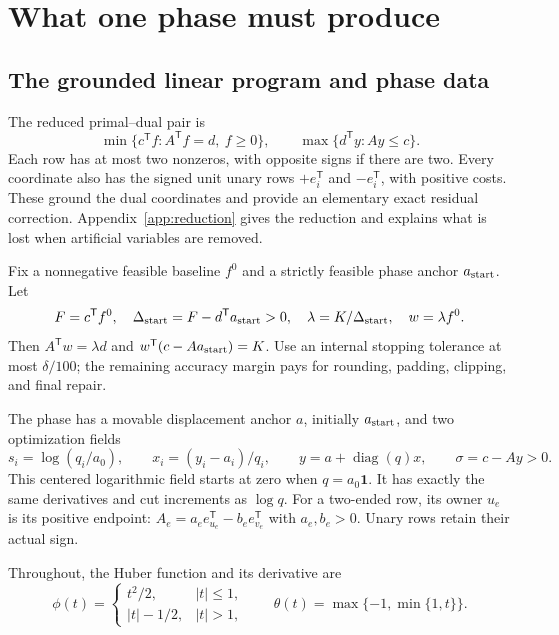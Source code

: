 \documentclass[11pt]{article}
\theoremstyle{definition}\newtheorem{definition}[theorem]{Definition}
\theoremstyle{remark}\newtheorem{remark}[theorem]{Remark}
\newcommand{\one}{\mathbf1}
\newcommand{\diag}{\operatorname{diag}}
\begin{document}
\section{What one phase must produce}\label{sec:phase-target}

\subsection{The grounded linear program and phase data}

The reduced primal--dual pair is
\begin{equation}\label{eq:LP}
 \min\{c^{\mathsf T}f:A^{\mathsf T}f=d,\ f\ge0\},
 \qquad \max\{d^{\mathsf T}y:Ay\le c\}.
\end{equation}
Each row has at most two nonzeros, with opposite signs if there are two.
Every coordinate also has the signed unit unary rows $+e_i^{\mathsf T}$
and $-e_i^{\mathsf T}$, with positive costs. These ground the dual
coordinates and provide an elementary exact residual correction.
Appendix~\ref{app:reduction} gives the reduction and explains what is
lost when artificial variables are removed.

Fix a nonnegative feasible baseline $f^0$ and a strictly feasible phase
anchor $a_{\rm start}$. Let
\begin{equation}\label{eq:phase-data}
 F=c^{\mathsf T}f^0,\quad
 \Delta_{\rm start}=F-d^{\mathsf T}a_{\rm start}>0,\quad
 \lambda=K/\Delta_{\rm start},\quad w=\lambda f^0.
\end{equation}
Then $A^{\mathsf T}w=\lambda d$ and
$w^{\mathsf T}(c-Aa_{\rm start})=K$. Use an internal stopping tolerance
at most $\delta/100$; the remaining accuracy margin pays for rounding,
padding, clipping, and final repair.

The phase has a movable displacement anchor $a$, initially
$a_{\rm start}$, and two optimization fields
\begin{equation}\label{eq:coordinates}
 s_i=\log(q_i/a_0),\qquad x_i=(y_i-a_i)/q_i,
 \qquad y=a+\diag(q)x,
 \qquad \sigma=c-Ay>0.
\end{equation}
This centered logarithmic field starts at zero when $q=a_0\one$.
It has exactly the same derivatives and cut increments as $\log q$.
For a two-ended row, its owner $u_e$ is its positive endpoint:
$A_e=a_e e_{u_e}^{\mathsf T}-b_e e_{v_e}^{\mathsf T}$ with
$a_e,b_e>0$. Unary rows retain their actual sign.

Throughout, the Huber function and its derivative are
\[
 \phi(t)=\begin{cases}t^2/2,&|t|\le1,\\ |t|-1/2,&|t|>1,\end{cases}
 \qquad\theta(t)=\max\{-1,\min\{1,t\}\}.
\]
\end{document}
